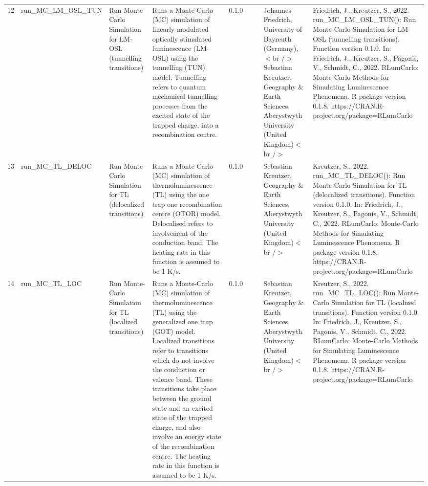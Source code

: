\begin{table}[ht]
\begin{tabular}{rllllllll}
 \\ 
  12 & run\_MC\_LM\_OSL\_TUN & Run Monte-Carlo Simulation for LM-OSL (tunnelling transitions) & Runs a Monte-Carlo (MC) simulation of linearly modulated optically stimulated luminescence (LM-OSL) using the tunnelling (TUN) model. Tunnelling refers to quantum mechanical tunnelling processes from the excited state of the trapped charge, into a recombination centre. & 0.1.0
 &  &  & Johannes Friedrich, University of Bayreuth (Germany),$<$br /$>$ Sebastian Kreutzer, Geography \& Earth Sciences, Aberystwyth University (United Kingdom)$<$br /$>$ & Friedrich, J., Kreutzer, S., 2022. run\_MC\_LM\_OSL\_TUN(): Run Monte-Carlo Simulation for LM-OSL (tunnelling transitions). Function version 0.1.0. In: Friedrich, J., Kreutzer, S., Pagonis, V., Schmidt, C., 2022. RLumCarlo: Monte-Carlo Methods for Simulating Luminescence Phenomena. R package version 0.1.8. https://CRAN.R-project.org/package=RLumCarlo
 \\ 
  13 & run\_MC\_TL\_DELOC & Run Monte-Carlo Simulation for TL (delocalized transitions) & Runs a Monte-Carlo (MC) simulation of thermoluminescence (TL) using the one trap one recombination centre (OTOR) model. Delocalised refers to involvement of the conduction band. The heating rate in this function is assumed to be 1 K/s. & 0.1.0
 &  &  & Sebastian Kreutzer, Geography \& Earth Sciences, Aberystwyth University (United Kingdom)$<$br /$>$ & Kreutzer, S., 2022. run\_MC\_TL\_DELOC(): Run Monte-Carlo Simulation for TL (delocalized transitions). Function version 0.1.0. In: Friedrich, J., Kreutzer, S., Pagonis, V., Schmidt, C., 2022. RLumCarlo: Monte-Carlo Methods for Simulating Luminescence Phenomena. R package version 0.1.8. https://CRAN.R-project.org/package=RLumCarlo
 \\ 
  14 & run\_MC\_TL\_LOC & Run Monte-Carlo Simulation for TL (localized transitions) & Runs a Monte-Carlo (MC) simulation of thermoluminescence (TL) using the generalized one trap (GOT) model. Localized transitions refer to transitions which do not involve the conduction or valence band. These transitions take place between the ground state and an excited state of the trapped charge, and also involve an energy state of the recombination centre. The heating rate in this function is assumed to be 1 K/s. & 0.1.0
 &  &  & Sebastian Kreutzer, Geography \& Earth Sciences, Aberystwyth University (United Kingdom)$<$br /$>$ & Kreutzer, S., 2022. run\_MC\_TL\_LOC(): Run Monte-Carlo Simulation for TL (localized transitions). Function version 0.1.0. In: Friedrich, J., Kreutzer, S., Pagonis, V., Schmidt, C., 2022. RLumCarlo: Monte-Carlo Methods for Simulating Luminescence Phenomena. R package version 0.1.8. https://CRAN.R-project.org/package=RLumCarlo

\end{tabular}
\end{table}
